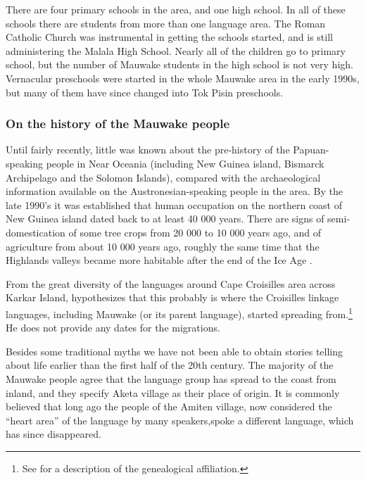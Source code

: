 There are four primary schools in the area, and one high school.  In all of these schools there are students from more than one language area. The Roman Catholic Church was instrumental in getting the schools started, and is still administering the Malala High School.  Nearly all of the children go to primary school, but the number of Mauwake students in the high school is not very high. Vernacular preschools were started in the whole Mauwake area in the early 1990s, but many of them have since changed into Tok Pisin preschools.

\subsubsection{On the history of the Mauwake people}
Until fairly recently, little was known about the pre-history of the Papuan-speaking people in Near Oceania (including New Guinea island, Bismarck Archipelago and the Solomon Islands), compared with the archaeological information available on the Austronesian-speaking people in the area. By the late 1990's it was established that human occupation on the northern coast of New Guinea island dated back to at least 40 000 years. There are signs of semi-domestication of some tree crops from 20 000 to 10 000 years ago, and of agriculture from about 10 000 years ago, roughly the same time that the Highlands valleys became more habitable after the end of the Ice Age \citep[xi-xvii]{Pawley2005a}. 

From the great diversity of the languages around Cape Croisilles area across Karkar Island, \citet[27]{Ross1996} hypothesizes that this probably is where the Croisilles linkage languages, including Mauwake (or its parent language), started spreading from.\footnote{See  for a description of the genealogical affiliation. }  He does not provide any dates for the migrations.


Besides some traditional myths we have not been able to obtain stories telling about life earlier than the first half of the 20th century.  The majority of the Mauwake people agree that the language group has spread to the coast from inland, and they specify Aketa village as their place of origin. It is commonly believed that long ago the people of the Amiten village, now considered the ``heart area'' of the language by many speakers,spoke a different language, which has since disappeared. 

